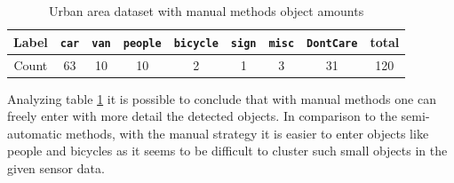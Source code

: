 \begin{table}[]
	\centering
	\caption{Urban area dataset with manual methods object amounts}
	\label{tab: urban2stats}
	\begin{tabular}{c|c|c|c|c|c|c|c|c}
		\textbf{Label} & \texttt{car} & \texttt{van} & \texttt{people} & \texttt{bicycle} & \texttt{sign} & \texttt{misc} & \texttt{DontCare} & \textbf{total} \\ \hline
		Count          & 63           & 10            & 10               & 2                & 1             & 3             & 31                & 120           
	\end{tabular}
\end{table}

Analyzing table \ref{tab: urban2stats} it is possible to conclude that with manual methods one can freely enter with more detail the detected objects. In comparison to the semi-automatic methods, with the manual strategy it is easier to enter objects like people and bicycles as it seems to be difficult to cluster such small objects in the given sensor data.











